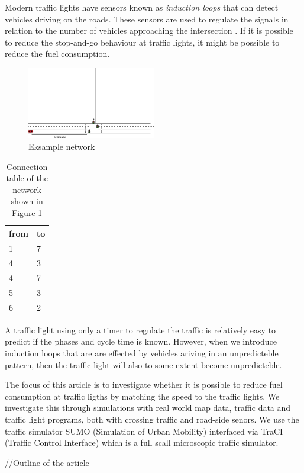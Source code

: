 Modern traffic lights have sensors known as \textit{induction loops} that can detect vehicles driving on the roads.
These sensors are used to regulate the signals in relation to the number of vehicles approaching the intersection \cite{Vejdir}. %
If it is possible to reduce the stop-and-go behaviour at traffic lights, it might be possible to reduce the fuel consumption.






\begin{figure}[htb]
\centering
\includegraphics[width=0.5\textwidth]{images/introNetwork.png}
\caption{Eksample network}
\label{fig:Introduction:network}
\end{figure}

\begin{table}[h]
\centering
\begin{tabular}{|l|l|}
\hline
from & to \\ \hline
1 & 7 \\ \hline
4 & 3 \\ \hline
4 & 7 \\ \hline
5 & 3 \\ \hline
6 & 2 \\ \hline
\end{tabular}
\caption{Connection table of the network shown in Figure \ref{fig:Introduction:network} }
\label{tab:Introduction:connectionTable}
\end{table}


A traffic light using only a timer to regulate the traffic is relatively easy to predict if the phases and cycle time is known. 
However, when we introduce induction loops that are are effected by vehicles ariving in an unpredicteble pattern, then the traffic light will also to some extent become unpredicteble. 

The focus of this article is to investigate whether it is possible to reduce fuel consumption at traffic ligths by matching the speed to the traffic lights. We investigate this through simulations with real world map data, traffic data and traffic light programs, both with crossing traffic and road-side senors. %
We use the traffic simulator SUMO (Simulation of Urban Mobility)\cite{sumo} interfaced via TraCI (Traffic Control Interface)\cite{traci} which is a full scall microscopic traffic simulator.

//Outline of the article





